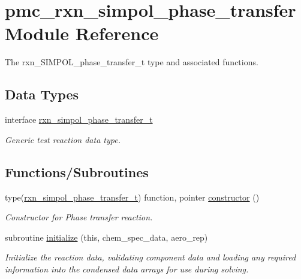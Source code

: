 \hypertarget{namespacepmc__rxn__simpol__phase__transfer}{}\section{pmc\+\_\+rxn\+\_\+simpol\+\_\+phase\+\_\+transfer Module Reference}
\label{namespacepmc__rxn__simpol__phase__transfer}


The rxn\+\_\+\+S\+I\+M\+P\+O\+L\+\_\+phase\+\_\+transfer\+\_\+t type and associated functions.  


\subsection*{Data Types}
\begin{DoxyCompactItemize}
\item 
interface \mbox{\hyperlink{structpmc__rxn__simpol__phase__transfer_1_1rxn__simpol__phase__transfer__t}{rxn\+\_\+simpol\+\_\+phase\+\_\+transfer\+\_\+t}}
\begin{DoxyCompactList}\small\item\em Generic test reaction data type. \end{DoxyCompactList}\end{DoxyCompactItemize}
\subsection*{Functions/\+Subroutines}
\begin{DoxyCompactItemize}
\item 
type(\mbox{\hyperlink{structpmc__rxn__simpol__phase__transfer_1_1rxn__simpol__phase__transfer__t}{rxn\+\_\+simpol\+\_\+phase\+\_\+transfer\+\_\+t}}) function, pointer \mbox{\hyperlink{namespacepmc__rxn__simpol__phase__transfer_a5ef9b6f52ac7c70ea3b93d8b947b8f03}{constructor}} ()
\begin{DoxyCompactList}\small\item\em Constructor for Phase transfer reaction. \end{DoxyCompactList}\item 
subroutine \mbox{\hyperlink{namespacepmc__rxn__simpol__phase__transfer_a717a70c576f34f6d3ae773bcc0a12ca0}{initialize}} (this, chem\+\_\+spec\+\_\+data, aero\+\_\+rep)
\begin{DoxyCompactList}\small\item\em Initialize the reaction data, validating component data and loading any required information into the condensed data arrays for use during solving. \end{DoxyCompactList}\end{DoxyCompactItemize}


